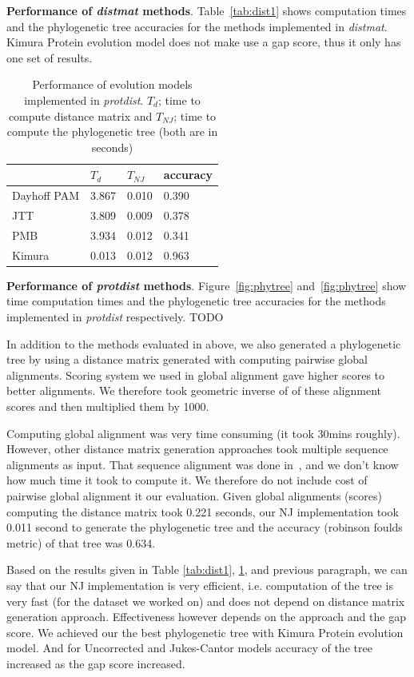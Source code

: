 \documentclass[11pt,letterpaper]{article}
\theoremstyle{definition}
\begin{document}
\textbf{Performance of \textit{distmat} methods}. Table~\ref{tab:dist1}  shows computation times and the phylogenetic tree accuracies for the methods implemented in \textit{distmat}. Kimura Protein evolution model does not make use a gap score, thus it only has one set of results.

\begin{table}[!h]
\centering
	\begin{tabular}{l|lll}


\hline
&	$T_d$	& $T_{NJ}$	& accuracy  \\
\hline
Dayhoff PAM	&	3.867	&	0.010	&	0.390	\\
JTT			&	3.809	&	0.009	&	0.378	\\
PMB			&	3.934	&	0.012	&	0.341	\\
Kimura		&	0.013	&	0.012	&	0.963	\\
\hline
\end{tabular}
\caption{Performance of evolution models implemented in \textit{protdist}. 
$T_d$; time to compute distance matrix and $T_{NJ}$; time to compute the phylogenetic tree (both are in seconds)}\label{tab:dist2}
\end{table}

\textbf{Performance of \textit{protdist} methods}. Figure~\ref{fig:phytree} and~\ref{fig:phytree} show time computation times and the phylogenetic tree accuracies for the methods implemented in \textit{protdist} respectively. TODO 

In addition to the methods evaluated in above, we also generated a phylogenetic tree by using a distance matrix generated with computing pairwise global alignments. Scoring system we used in global alignment gave higher scores to better alignments. We therefore took geometric inverse of of these alignment scores and then multiplied them by 1000. 

Computing global alignment was very time consuming (it took 30mins roughly). However, other distance matrix generation approaches took multiple sequence alignments as input. That sequence alignment was done in~\cite{khafif2014identification}, and we don't know how much time it took to compute it. We therefore do not include cost of pairwise global alignment it our evaluation. Given global alignments (scores) computing the distance matrix took 0.221 seconds, our NJ implementation took 0.011 second to generate the phylogenetic tree and the accuracy (robinson foulds metric) of that tree was 0.634.

Based on the results given in Table \ref{tab:dist1}, \ref{tab:dist2}, and previous paragraph, we can say that our NJ implementation is very efficient, i.e. computation of the tree is very fast (for the dataset we worked on) and does not depend on distance matrix generation approach. Effectiveness however depends on the approach and the gap score. We achieved our the best phylogenetic tree with Kimura Protein evolution model. And for Uncorrected and Jukes-Cantor models accuracy of the tree increased as the gap score increased.
\end{document}
